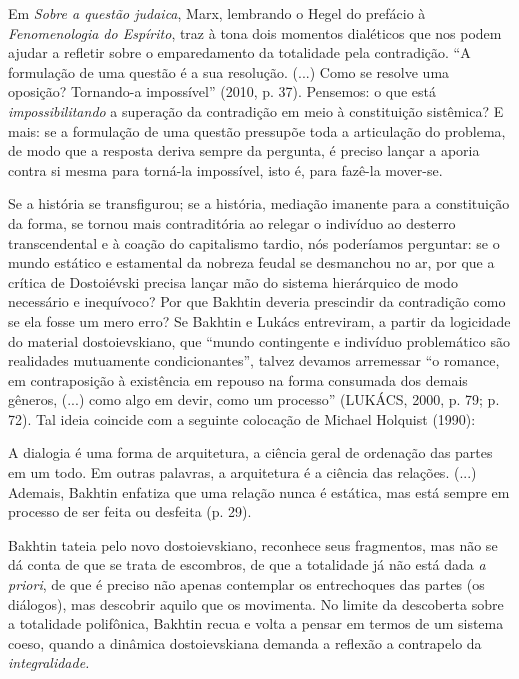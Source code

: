 Em \emph{Sobre a questão judaica}, Marx, lembrando o Hegel do prefácio à
\emph{Fenomenologia do Espírito}, traz à tona dois momentos dialéticos
que nos podem ajudar a refletir sobre o emparedamento da totalidade pela
contradição. ``A formulação de uma questão é a sua resolução. (...) Como
se resolve uma oposição? Tornando-a impossível'' (2010, p. 37).
Pensemos: o que está \emph{impossibilitando} a superação da contradição
em meio à constituição sistêmica? E mais: se a formulação de uma questão
pressupõe toda a articulação do problema, de modo que a resposta deriva
sempre da pergunta, é preciso lançar a aporia contra si mesma para
torná-la impossível, isto é, para fazê-la mover-se.

Se a história se transfigurou; se a história, mediação imanente para a
constituição da forma, se tornou mais contraditória ao relegar o
indivíduo ao desterro transcendental e à coação do capitalismo tardio,
nós poderíamos perguntar: se o mundo estático e estamental da nobreza
feudal se desmanchou no ar, por que a crítica de Dostoiévski precisa
lançar mão do sistema hierárquico de modo necessário e inequívoco? Por
que Bakhtin deveria prescindir da contradição como se ela fosse um mero
erro? Se Bakhtin e Lukács entreviram, a partir da logicidade do material
dostoievskiano, que ``mundo contingente e indivíduo problemático são
realidades mutuamente condicionantes'', talvez devamos arremessar ``o
romance, em contraposição à existência em repouso na forma consumada dos
demais gêneros, (...) como algo em devir, como um processo'' (LUKÁCS,
2000, p. 79; p. 72). Tal ideia coincide com a seguinte colocação de
Michael Holquist (1990):

A dialogia é uma forma de arquitetura, a ciência geral de ordenação das
partes em um todo. Em outras palavras, a arquitetura é a ciência das
relações. (...) Ademais, Bakhtin enfatiza que uma relação nunca é
estática, mas está sempre em processo de ser feita ou desfeita (p. 29).

Bakhtin tateia pelo novo dostoievskiano, reconhece seus fragmentos, mas
não se dá conta de que se trata de escombros, de que a totalidade já não
está dada \emph{a priori}, de que é preciso não apenas contemplar os
entrechoques das partes (os diálogos), mas descobrir aquilo que os
movimenta. No limite da descoberta sobre a totalidade polifônica,
Bakhtin recua e volta a pensar em termos de um sistema coeso, quando a
dinâmica dostoievskiana demanda a reflexão a contrapelo da
\emph{integralidade. }

